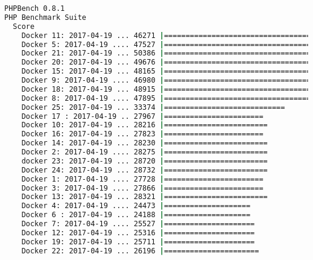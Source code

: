 \documentclass[french]{article}
\begin{document}
\begin{lstlisting}[language=bash,caption={}]
PHPBench 0.8.1
PHP Benchmark Suite
  Score
    Docker 11: 2017-04-19 ... 46271 |=======================================
    Docker 5: 2017-04-19 .... 47527 |========================================
    Docker 21: 2017-04-19 ... 50386 |==========================================
    Docker 20: 2017-04-19 ... 49676 |=========================================
    Docker 15: 2017-04-19 ... 48165 |========================================
    Docker 9: 2017-04-19 .... 46980 |=======================================
    Docker 18: 2017-04-19 ... 48915 |=========================================
    Docker 8: 2017-04-19 .... 47895 |========================================
    Docker 25: 2017-04-19 ... 33374 |============================
    Docker 17 : 2017-04-19 .. 27967 |=======================
    Docker 10: 2017-04-19 ... 28216 |========================
    Docker 16: 2017-04-19 ... 27823 |=======================
    Docker 14: 2017-04-19 ... 28230 |========================
    Docker 2: 2017-04-19 .... 28275 |========================
    docker 23: 2017-04-19 ... 28720 |========================
    Docker 24: 2017-04-19 ... 28732 |========================
    Docker 1: 2017-04-19 .... 27728 |=======================
    Docker 3: 2017-04-19 .... 27866 |=======================
    Docker 13: 2017-04-19 ... 28321 |========================
    Docker 4: 2017-04-19 .... 24473 |====================
    Docker 6 : 2017-04-19 ... 24188 |====================
    Docker 7: 2017-04-19 .... 25527 |=====================
    Docker 12: 2017-04-19 ... 25316 |=====================
    Docker 19: 2017-04-19 ... 25711 |=====================
    Docker 22: 2017-04-19 ... 26196 |======================

\end{lstlisting}
\newpage
\end{document}
